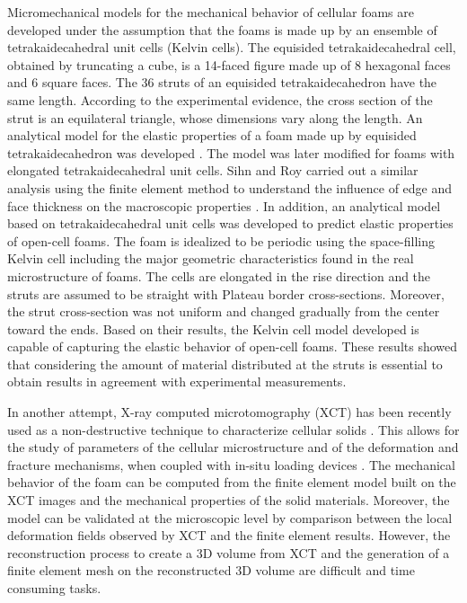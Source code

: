 \documentclass[review]{elsarticle}
\begin{document}
Micromechanical models for the mechanical behavior of cellular foams are developed under the assumption that the foams is made up by an ensemble of tetrakaidecahedral unit cells (Kelvin cells)\citep{Jang20102872,Sullivan20081754,Subramanian25052012}. The equisided tetrakaidecahedral cell, obtained by truncating a cube, is a 14-faced figure made up of 8 hexagonal faces and 6 square faces. The 36 struts of an equisided tetrakaidecahedron have the same length. According to the experimental evidence, the cross section of the strut is an equilateral triangle, whose dimensions vary along the length. An analytical model for the elastic properties of a foam made up by equisided tetrakaidecahedron was developed \cite{ZHU1997319}. The model was later modified for foams with elongated tetrakaidecahedral unit cells\citep{Sullivan20081754,Li20031769}. Sihn and Roy carried out a similar analysis using the finite element method to understand the influence of edge and face thickness on the macroscopic properties \citep{Sihn2004167}. In addition, an analytical model based on tetrakaidecahedral unit cells was developed to predict elastic properties of open-cell foams\citep{Jang20102872}. The foam is idealized to be periodic using the space-filling Kelvin cell including the major geometric characteristics found in the real microstructure of foams. The cells are elongated in the rise direction and the struts are assumed to be straight with Plateau border cross-sections. Moreover, the strut cross-section was not uniform and changed gradually from the center toward the ends. Based on their results, the Kelvin cell model developed is capable of capturing the elastic behavior of open-cell foams. These results showed that considering the amount of material distributed at the struts is essential to obtain results in agreement with experimental measurements. 

In another attempt, X-ray computed microtomography (XCT) has been recently used as a non-destructive technique to characterize cellular solids \citep{bartsmith1998,Elliott2002}. This allows for the study of parameters of the cellular microstructure and of the deformation and fracture mechanisms, when coupled with in-situ loading devices \cite{Youssef2005719}. The mechanical behavior of the foam can be computed from the finite element model built on the XCT images and the mechanical properties of the solid materials. Moreover, the model can be validated at the microscopic level by comparison between the local deformation fields observed by XCT and the finite element results. However, the reconstruction process to create a 3D volume from XCT and the generation of a finite element mesh on the reconstructed 3D volume are difficult and time consuming tasks. 
\end{document}
